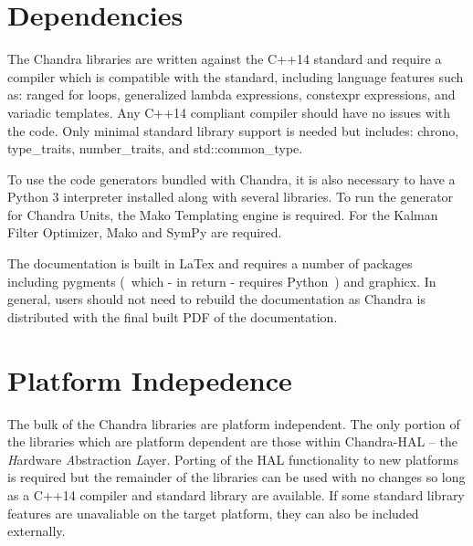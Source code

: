 \documentclass[12pt,letterpaper,article]{memoir} %
\begin{document}
\section{Dependencies}
The Chandra libraries are written against the C++14 standard and require a compiler which is compatible with the standard, including language features such as: ranged for loops, generalized lambda expressions, constexpr expressions, and variadic templates.  Any C++14 compliant compiler should have no issues with the code.  Only minimal standard library support is needed but includes: chrono, type\_traits, number\_traits, and std::common\_type.  

To use the code generators bundled with Chandra, it is also necessary to have a Python 3 interpreter installed along with several libraries.  To run the generator for Chandra Units, the Mako Templating engine is required.  For the Kalman Filter Optimizer, Mako and SymPy are required.

The documentation is built in LaTex and requires a number of packages including pygments (~which - in return - requires Python~) and graphicx.  In general, users should not need to rebuild the documentation as Chandra is distributed with the final built PDF of the documentation.
 
\section{Platform Indepedence}
The bulk of the Chandra libraries are platform independent.  The only portion of the libraries which are platform dependent are those within Chandra-HAL -- the \emph{H}ardware \emph{A}bstraction \emph{L}ayer.  Porting of the HAL functionality to new platforms is required but the remainder of the libraries can be used with no changes so long as a C++14 compiler and standard library are available.  If some standard library features are unavaliable on the target platform, they can also be included externally.
\end{document}
